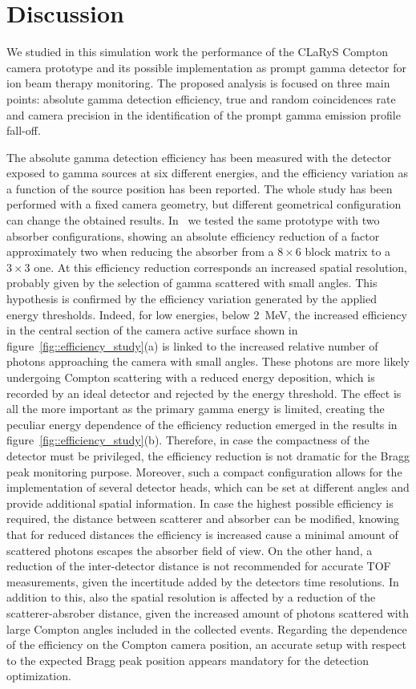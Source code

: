 \section{Discussion}

We studied in this simulation work the performance of the CLaRyS Compton camera prototype and its possible implementation as prompt gamma detector for ion beam therapy monitoring. The proposed analysis is focused on three main points: absolute gamma detection efficiency, true and random coincidences rate and camera precision in the identification of the prompt gamma emission profile fall-off.

The absolute gamma detection efficiency has been measured with the detector exposed to gamma sources at six different energies, and the efficiency variation as a function of the source position has been reported. The whole study has been performed with a fixed camera geometry, but different geometrical configuration can change the obtained results. In~\cite{Fontana_APPB} we tested the same prototype with two absorber configurations, showing an absolute efficiency reduction of a factor approximately two when reducing the absorber from a $8\times6$ block matrix to a $3\times3$ one. At this efficiency reduction corresponds an increased spatial resolution, probably given by the selection of gamma scattered with small angles. This hypothesis is confirmed by the efficiency variation generated by the applied energy thresholds. Indeed, for low energies, below 2~MeV, the increased efficiency in the central section of the camera active surface shown in figure~\ref{fig::efficiency_study}(a) is linked to the increased relative number of photons approaching the camera with small angles. These photons are more likely undergoing Compton scattering with a reduced energy deposition, which is recorded by an ideal detector and rejected by the energy threshold. The effect is all the more important as the primary gamma energy is limited, creating the peculiar energy dependence of the efficiency reduction emerged in the results in figure~\ref{fig::efficiency_study}(b). Therefore, in case the compactness of the detector must be privileged, the efficiency reduction is not dramatic for the Bragg peak monitoring purpose. Moreover, such a compact configuration allows for the implementation of several detector heads, which can be set at different angles and provide additional spatial information. In case the highest possible efficiency is required, the distance between scatterer and absorber can be modified, knowing that for reduced distances the efficiency is increased cause a minimal amount of scattered photons escapes the absorber field of view. On the other hand, a reduction of the inter-detector distance is not recommended for accurate TOF measurements, given the incertitude added by the detectors time resolutions. In addition to this, also the spatial resolution is affected by a reduction of the scatterer-absrober distance, given the increased amount of photons scattered with large Compton angles included in the collected events.   
Regarding the dependence of the efficiency on the Compton camera position, an accurate setup with respect to the expected Bragg peak position appears mandatory for the detection optimization.

